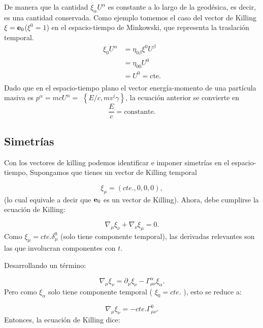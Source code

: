 De manera que la cantidad $\xi_\alpha U^\alpha$ es constante a lo largo de la geodésica, es decir, es una cantidad conservada.
Como ejemplo tomemos el caso del vector de Killing $\mathbf{\xi} = \mathbf{e}_0$($\xi^0 =1$) en el espacio-tiempo de Minkowski, que representa la traslación temporal.
\begin{equation}
    \begin{aligned}
        \xi_0 U^\alpha & = \eta_{0 \beta} \xi^0 U^\beta \\
                       & = \eta_{0 0 } U^0              \\
                       & = U^0 = \text{cte.}            \\
    \end{aligned}
\end{equation}
Dado que en el espacio-tiempo plano el vector energía-momento de una partícula masiva es $p^\alpha=m c U^\alpha=$ $\left\{E / c, m v^i \gamma\right\}$, la ecuación anterior se convierte en
\[
    \frac{E}{c}=\text{constante}.
\]


\subsection{Simetrías }
\label{subsec:simetria}
Con los  vectores de killing podemos identificar e imponer simetrías en el espacio-tiempo,
Supongamos que tienes un vector de Killing temporal

\begin{equation}
    \xi_\mu=(cte.,0,0,0),
\end{equation}
(lo cual equivale a decir que $\mathbf{e}_0$ es un vector de Killing).
Ahora, debe cumplirse la ecuación de Killing:

\begin{equation}
    \nabla_\mu \xi_\nu+\nabla_\nu \xi_\mu=0.
\end{equation}
Como $\xi_\mu=cte. \delta_\mu^0$ (solo tiene componente temporal), las derivadas relevantes son las que involucran componentes con $t$.

Desarrollando un término:

\begin{equation}
    \nabla_\mu \xi_\nu=\partial_\mu \xi_\nu-\Gamma_{\mu \nu}^\alpha \xi_\alpha.
\end{equation}
Pero como $\xi_\alpha$ solo tiene componente temporal ( $\xi_0=cte.$ ), esto se reduce a:

\begin{equation}
    \nabla_\mu \xi_\nu=-cte.\Gamma_{\mu \nu}^0   .
\end{equation}
Entonces, la ecuación de Killing dice:

